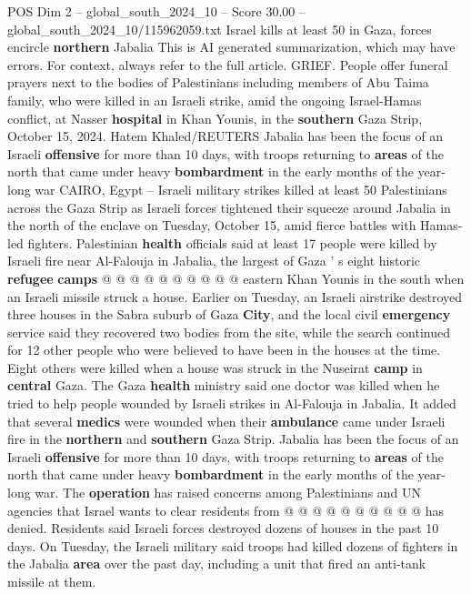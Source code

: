 \begin{textsample}{POS Dim 2 – global\_south\_2024\_10 – Score 30.00 – global\_south\_2024\_10/115962059.txt}  \label{ex:f2_pos_133}
Israel kills at least 50 in Gaza, forces encircle \textbf{northern} Jabalia This is AI generated summarization, which may have errors.
For context, always refer to the full article.
GRIEF.
People offer funeral prayers next to the bodies of Palestinians including members of Abu Taima family, who were killed in an Israeli strike, amid the ongoing Israel-Hamas conflict, at Nasser \textbf{hospital} in Khan Younis, in the \textbf{southern} Gaza Strip, October 15, 2024.
Hatem Khaled/REUTERS Jabalia has been the focus of an Israeli \textbf{offensive} for more than 10 days, with troops returning to \textbf{areas} of the north that came under heavy \textbf{bombardment} in the early months of the year-long war CAIRO, Egypt -- Israeli military strikes killed at least 50 Palestinians across the Gaza Strip as Israeli forces tightened their squeeze around Jabalia in the north of the enclave on Tuesday, October 15, amid fierce battles with Hamas-led fighters.
Palestinian \textbf{health} officials said at least 17 people were killed by Israeli fire near Al-Falouja in Jabalia, the largest of Gaza ' s eight historic \textbf{refugee} \textbf{camps} @ @ @ @ @ @ @ @ @ @ eastern Khan Younis in the south when an Israeli missile struck a house.
Earlier on Tuesday, an Israeli airstrike destroyed three houses in the Sabra suburb of Gaza \textbf{City}, and the local civil \textbf{emergency} service said they recovered two bodies from the site, while the search continued for 12 other people who were believed to have been in the houses at the time.
Eight others were killed when a house was struck in the Nuseirat \textbf{camp} in \textbf{central} Gaza.
The Gaza \textbf{health} ministry said one doctor was killed when he tried to help people wounded by Israeli strikes in Al-Falouja in Jabalia.
It added that several \textbf{medics} were wounded when their \textbf{ambulance} came under Israeli fire in the \textbf{northern} and \textbf{southern} Gaza Strip.
Jabalia has been the focus of an Israeli \textbf{offensive} for more than 10 days, with troops returning to \textbf{areas} of the north that came under heavy \textbf{bombardment} in the early months of the year-long war.
The \textbf{operation} has raised concerns among Palestinians and UN agencies that Israel wants to clear residents from @ @ @ @ @ @ @ @ @ @ has denied.
Residents said Israeli forces destroyed dozens of houses in the past 10 days.
On Tuesday, the Israeli military said troops had killed dozens of fighters in the Jabalia \textbf{area} over the past day, including a unit that fired an anti-tank missile at them.

\end{textsample}
